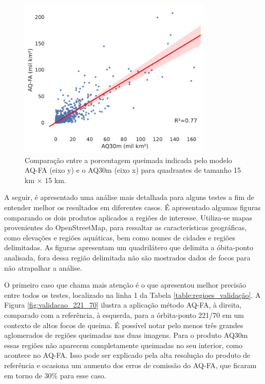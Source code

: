 \documentclass[cic,tc]{iiufrgs}
\begin{document}
\begin{figure}[!htb]
    \caption{Comparação entre a porcentagem queimada indicada pelo modelo AQ-FA (eixo y) e o AQ30m (eixo x) para quadrantes de tamanho 15 km $\times$ 15 km.}
    \begin{center}
        \includegraphics[width=25em]{regressao_aq30m}
    \end{center}
    \label{fig:regressao_aq30m}
\end{figure}


A seguir, é apresentado uma análise mais detalhada para alguns testes a fim de entender melhor os resultados em diferentes casos. É apresentado algumas figuras comparando os dois produtos aplicados a regiões de interesse. Utiliza-se mapas provenientes do OpenStreetMap, para ressaltar as características geográficas, como elevações e regiões aquáticas, bem como nomes de cidades e regiões delimitadas. As figuras apresentam um quadrilátero que delimita a óbita-ponto analisada, fora dessa região delimitada não são mostrados dados de focos para não atrapalhar a análise.

O primeiro caso que chama mais atenção é o que apresentou melhor precisão entre todos os testes, localizado na linha 1 da Tabela \ref{table:regioes_validação}. A Figura \ref{fig:validacao_221_70} ilustra a aplicação método AQ-FA, à direita, comparado com a referência, à esquerda, para a órbita-ponto 221/70 em um contexto de altos focos de queima. É possível notar pelo menos três grandes aglomerados de regiões queimadas nas duas imagens. Para o produto AQ30m essas regiões não aparecem completamente queimadas no seu interior, como acontece no AQ-FA. Isso pode ser explicado pela alta resolução do produto de referência e ocasiona um aumento dos erros de comissão do AQ-FA, que ficaram em torno de 30\% para esse caso. 
\end{document}
